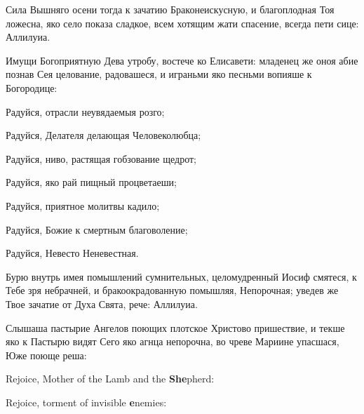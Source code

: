 
\Ierei Сила Вышняго осени тогда к зачатию Браконеискусную, и благоплодная Тоя ложесна, яко село показа сладкое, всем хотящим жати спасение, всегда пети сице: Аллилуиа.


\Ierei Имущи Богоприятную Дева утробу, востече ко Елисавети: младенец же оноя абие познав Сея целование, радовашеся, и играньми яко песньми вопияше к Богородице:

\KhorRaduisya Радуйся, отрасли неувядаемыя розго;


Радуйся, Делателя делающая Человеколюбца;


Радуйся, ниво, растящая гобзование щедрот;


Радуйся, яко рай пищный процветаеши;


Радуйся, приятное молитвы кадило;


Радуйся, Божие к смертным благоволение;


Радуйся, Невесто Неневестная.


\Ierei Бурю внутрь имея помышлений сумнительных, целомудренный Иосиф смятеся, к Тебе зря небрачней, и бракоокрадованную помышляя, Непорочная; уведев же Твое зачатие от Духа Свята, рече: Аллилуиа.


\Ierei Слышаша пастырие Ангелов поющих плотское Христово пришествие, и текше яко к Пастырю видят Сего яко агнца непорочна, во чреве Мариине упасшася, Юже поюще реша:

\pagebreak



\PeopleRejoice Rejoice, Mother of the Lamb and the \textbf{She}pherd:


Rejoice, torment of invisible \textbf{e}nemies:

